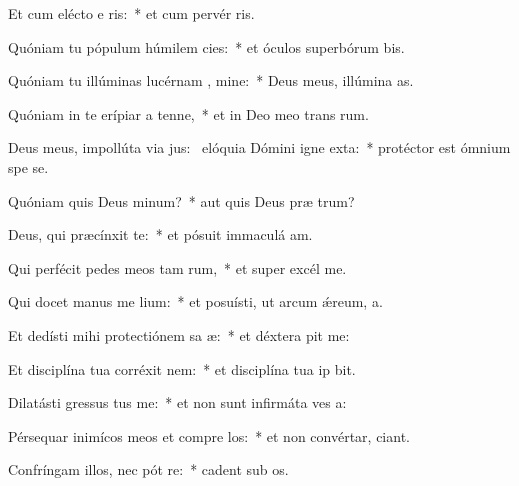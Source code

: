 \item Et cum elécto e ris:~* et cum pervér ris.
\item Quóniam tu pópulum húmilem  cies:~* et óculos superbórum bis.
\item Quóniam tu illúminas lucérnam , mine:~* Deus meus, illúmina  as.
\item Quóniam in te erípiar a tenne,~* et in Deo meo trans rum.
\item Deus meus, impollúta via jus:~\pscross{} elóquia Dómini igne exta:~* protéctor est ómnium spe  se.
\item Quóniam quis Deus  minum?~* aut quis Deus præ  trum?
\item Deus, qui præcínxit  te:~* et pósuit immaculá  am.
\item Qui perfécit pedes meos tam rum,~* et super excél  me.
\item Qui docet manus me  lium:~* et posuísti, ut arcum ǽreum,  a.
\item Et dedísti mihi protectiónem sa æ:~* et déxtera  pit me:
\item Et disciplína tua corréxit   nem:~* et disciplína tua ip  bit.
\item Dilatásti gressus  tus me:~* et non sunt infirmáta ves a:
\item Pérsequar inimícos meos et compre los:~* et non convértar,  ciant.
\item Confríngam illos, nec pót re:~* cadent sub  os.
